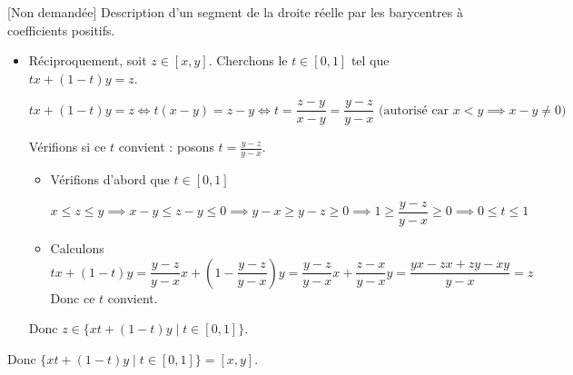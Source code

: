 \documentclass{article}
\begin{document}
\begin{question_kholle}[{
				Soient $(x, y) \in \R^2$ tels que $x \leqslant y$. $$[x, y] = \{z \in \R \mid x \leqslant z \leqslant y \} = \{tx + (1-t)y \mid t \in [0, 1]\}$$
			}]{[Non demandée] Description d'un segment de la droite réelle par les barycentres à coefficients positifs.}
\begin{itemize}[label=$\star$]
		\item Réciproquement, soit $z \in[x, y]$. Cherchons le $t\in[0, 1]$ tel que $tx + (1-t)y = z$.

		      $$
			      tx + (1-t)y = z \iff t(x-y) = z-y \iff t = \frac{z-y}{x-y} = \frac{y-z}{y-x} \text{ (autorisé car }x<y \implies x-y \neq 0 \text{)}
		      $$

		      Vérifions si ce $t$ convient : posons $t = \frac{y-z}{y-x}$.
		      \begin{itemize}[label=$\bullet$]
			      \item Vérifions d'abord que $t \in [0,1]$

			            $$
				            x\leqslant z \leqslant y
				            \implies x-y \leqslant z-y \leqslant 0 \implies y-x\geqslant y-z \geqslant 0 \implies 1 \geqslant \frac{y-z}{y-x} \geqslant 0 \implies 0\leqslant t \leqslant 1
			            $$
			      \item Calculons
			            $$
				            tx+(1-t)y = \frac{y-z}{y-x} x + \left( 1- \frac{y-z}{y-x} \right)y = \frac{y-z}{y-x}x + \frac{z-x}{y-x}y = \frac{yx-zx+zy - xy}{y-x} =  z
			            $$
			            Donc ce $t$ convient.
		      \end{itemize}
		      Donc $z \in \{ xt+(1-t)y \mid t \in [0, 1] \}$.
	\end{itemize}
	Donc $\{ xt+(1-t)y \mid t \in [0, 1] \} = [x, y]$.
\end{question_kholle}
\end{document}
